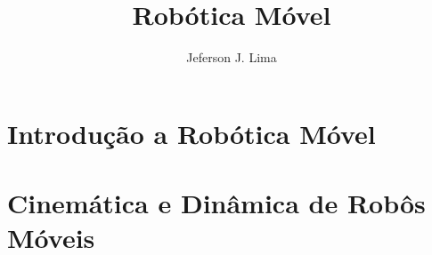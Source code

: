 \documentclass[krantz1,ChapterTOCs]{krantz}
\begin{document}
\frontmatter

\title{Robótica Móvel 
}
\author{Jeferson J. Lima}

\maketitle

%
\setcounter{page}{7} %
\tableofcontents
%
%
\listoffigures
\listoftables
%
%

\mainmatter


\part{Introdução a Robótica Móvel}


\part{Cinemática e Dinâmica de Robôs Móveis}











\printindex
\end{document}
